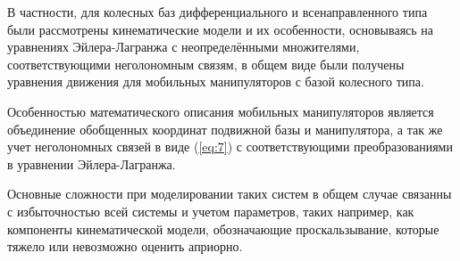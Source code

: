 \documentclass[14pt, a4paper]{extreport}
\begin{document}
В частности, для колесных баз дифференциального и всенаправленного типа были рассмотрены кинематические модели и их особенности, основываясь на уравнениях Эйлера-Лагранжа с неопределёнными множителями, соответствующими неголономным связям, в общем виде были получены уравнения движения для мобильных манипуляторов с базой колесного типа.

Особенностью математического описания мобильных манипуляторов является объединение обобщенных координат подвижной базы и манипулятора, а так же учет неголономных связей в виде (\ref{eq:7}) с соответствующими преобразованиями в уравнении Эйлера-Лагранжа. 

Основные сложности при моделировании таких систем в общем случае связанны с избыточностью всей системы и учетом параметров, таких например, как компоненты кинематической модели, обозначающие проскальзывание, которые тяжело или невозможно оценить априорно. 
 
\end{document}
